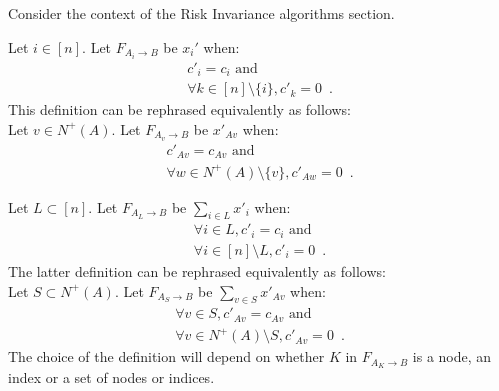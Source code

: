 \begin{definition}

  Consider the context of the Risk Invariance algorithms section.

   Let $i \in [n]$. Let $F_{A_i \rightarrow B}$ be $x_i'$ when:
   \begin{equation*}
   \begin{gathered}
      c'_i = c_i \mbox{ and} \\
      \forall k \in [n] \setminus \{i\}, c'_k = 0 \enspace.
   \end{gathered}
   \end{equation*}
   This definition can be rephrased equivalently as follows: \\
   Let $v \in N^{+}\left(A\right)$. Let $F_{A_v \rightarrow B}$ be $x'_{Av}$ when:
   \begin{equation*}
   \begin{gathered}
      c'_{Av} = c_{Av} \mbox{ and} \\
      \forall w \in N^{+}\left(A\right) \setminus \{v\}, c'_{Aw} = 0 \enspace.
   \end{gathered}
   \end{equation*}

   Let $L \subset [n]$. Let $F_{A_L \rightarrow B}$ be $\sum\limits_{i \in L}x'_i$ when:
   \begin{equation*}
   \begin{gathered}
      \forall i \in L, c'_i = c_i \mbox{ and} \\ 
      \forall i \in [n] \setminus L, c'_i = 0 \enspace.
   \end{gathered}
   \end{equation*} 
   The latter definition can be rephrased equivalently as follows: \\
   Let $S \subset N^{+}\left(A\right)$. Let $F_{A_S \rightarrow B}$ be
   $\sum\limits_{v \in S}x'_{Av}$ when:
   \begin{equation*}
   \begin{gathered}
      \forall v \in S, c'_{Av} = c_{Av} \mbox{ and} \\
      \forall v \in N^{+}\left(A\right) \setminus S, c'_{Av} = 0 \enspace.
   \end{gathered}
   \end{equation*}
   The choice of the definition will depend on whether $K$ in $F_{A_K \rightarrow B}$ is a node, an index or a set of nodes
   or indices.
\end{definition}
